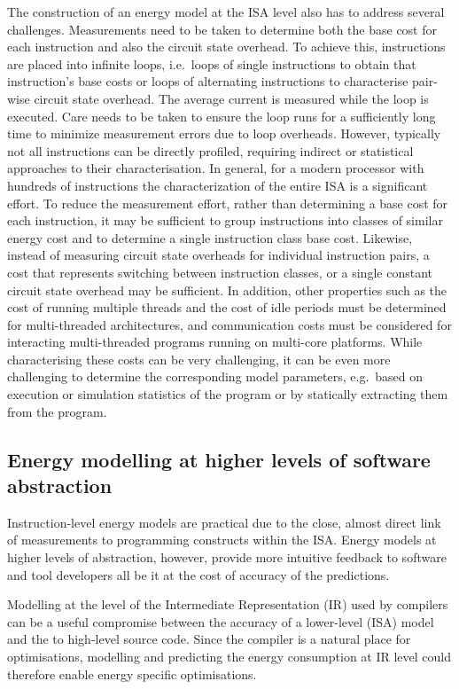The construction of an energy model at the ISA level also has to address several
challenges.
%
Measurements need to be taken to determine both the base cost for each
instruction and also the circuit state overhead. To achieve this, instructions
are placed into infinite loops, i.e.\ loops of single instructions to obtain
that instruction's base costs or loops of alternating instructions to
characterise pair-wise circuit state overhead. The average current is measured
while the loop is executed. Care needs to be taken to ensure the loop runs for
a sufficiently long time to minimize measurement errors due to loop overheads.
%
However, typically not all instructions can be directly profiled, requiring
indirect or statistical approaches to their characterisation.
%
In general, for a modern processor with hundreds of instructions the
characterization of the entire ISA is a significant effort.
%
To reduce the measurement effort, rather than determining a base cost for each
instruction, it may be sufficient to group instructions into classes of similar
energy cost and to determine a single instruction class base cost. Likewise,
instead of measuring circuit state overheads for individual instruction pairs,
a cost that represents switching between instruction classes, or a single
constant circuit state overhead may be sufficient.
%
In addition, other properties such as the cost of running multiple threads and
the cost of idle periods must be determined for multi-threaded architectures,
and communication costs must be considered for interacting multi-threaded
programs running on multi-core platforms. 
%
While characterising these costs can be very challenging, it can be even more
challenging to determine the corresponding model parameters, e.g.\ based on
execution or simulation statistics of the program or by statically extracting
them from the program.

\subsection{Energy modelling at higher levels of software abstraction}
\label{subsec:mapping}

Instruction-level energy models are practical due to the close, almost direct
link of measurements to programming constructs within the ISA. Energy models at
higher levels of abstraction, however, provide more intuitive feedback to
software and tool developers all be it at the cost of accuracy of the
predictions.

Modelling at the level of the Intermediate Representation (IR) used by
compilers can be a useful compromise between the accuracy of a lower-level
(ISA) model and the to high-level source code. Since the compiler is a natural
place for optimisations, modelling and predicting the energy consumption at IR
level could therefore enable energy specific optimisations.

